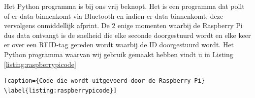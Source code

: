 Het Python programma is bij ons vrij beknopt. Het is een programma dat pollt of er data binnenkomt via Bluetooth en indien er data binnenkomt, deze vervolgens onmiddellijk afprint. De 2 enige momenten waarbij de Raspberry Pi dus data ontvangt is de snelheid die elke seconde doorgestuurd wordt en elke keer er over een RFID-tag gereden wordt waarbij de ID doorgestuurd wordt. Het Python programma waarvan wij gebruik gemaakt hebben vindt u in Listing \ref{listing:raspberrypicode}



\begin{lstlisting}[caption={Code die wordt uitgevoerd door de Raspberry Pi} \label{listing:raspberrypicode}]
\end{lstlisting}



